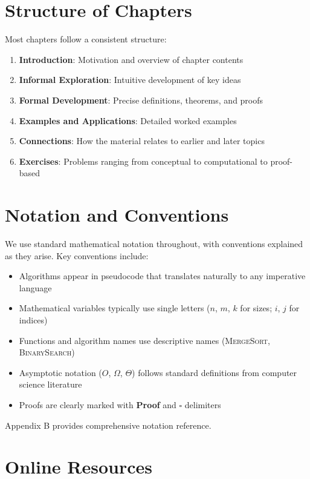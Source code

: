 \section*{Structure of Chapters}

Most chapters follow a consistent structure:

\begin{enumerate}
    \item \textbf{Introduction}: Motivation and overview of chapter contents
    \item \textbf{Informal Exploration}: Intuitive development of key ideas
    \item \textbf{Formal Development}: Precise definitions, theorems, and proofs
    \item \textbf{Examples and Applications}: Detailed worked examples
    \item \textbf{Connections}: How the material relates to earlier and later topics
    \item \textbf{Exercises}: Problems ranging from conceptual to computational to proof-based
\end{enumerate}

\section*{Notation and Conventions}

We use standard mathematical notation throughout, with conventions explained as they arise. Key conventions include:

\begin{itemize}
    \item Algorithms appear in pseudocode that translates naturally to any imperative language
    \item Mathematical variables typically use single letters ($n$, $m$, $k$ for sizes; $i$, $j$ for indices)
    \item Functions and algorithm names use descriptive names (\textsc{MergeSort}, \textsc{BinarySearch})
    \item Asymptotic notation ($O$, $\Omega$, $\Theta$) follows standard definitions from computer science literature
    \item Proofs are clearly marked with \textbf{Proof} and \textbf{$\square$} delimiters
\end{itemize}

Appendix B provides comprehensive notation reference.

\section*{Online Resources}

